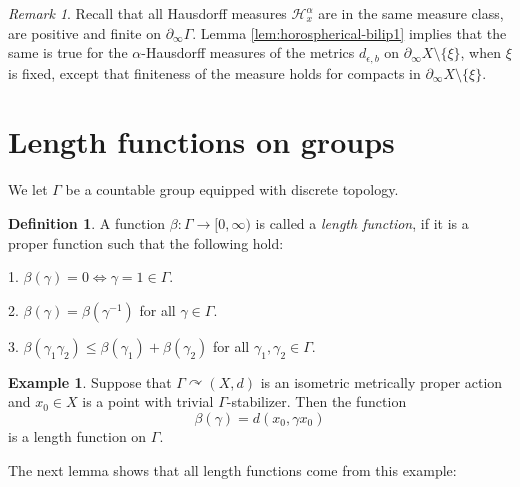\documentclass[12pt]{amsbook}%
\theoremstyle{definition}
\newtheorem{defi}[thm]{Definition}
\newtheorem{example}[thm]{Example}
\theoremstyle{remark}
\newtheorem{rem}[thm]{Remark}
\numberwithin{section}{chapter}
\numberwithin{subsection}{section}
\numberwithin{figure}{chapter}
\DeclareMathOperator{\acts}{\curvearrowright}
\def\eps{\epsilon}
\def\cH{{\mathscr{H}}}
\def\Ga{\Gamma}
\def\ga{\gamma}
\def\al{\alpha}
\def\geo{\partial_\infty}
\def\kap{}
\begin{document}

\begin{rem}
Recall that all Hausdorff measures $\cH^\al_x$ are in the same measure class, are positive and finite on $\geo \Ga$. Lemma \ref{lem:horospherical-bilip1} implies that  
the same is true for the $\al$-Hausdorff measures of the metrics $d_{\eps,b}$ on $\geo X\setminus \{\xi\}$, when $\xi$ is fixed, except that finiteness of the measure 
holds for compacts in $\geo X\setminus \{\xi\}$. 
\end{rem}


\section{Length functions on groups}\label{sec:length functions}



We let $\Gamma$ be a countable group equipped with discrete topology. 

\begin{defi} A function $\beta: \Gamma\to [0,\infty)$ is called  a {\em length function}, if it is  
a proper function such that the following hold:

1. $\beta(\ga)=0\iff \ga =1\in \Ga$.

2.  $\beta(\gamma)=\beta(\gamma^{-1})$ for all $\gamma\in\Gamma$. 
 
3. $\beta(\gamma_1 \gamma_2)\leqslant \beta(\gamma_1) + \beta(\gamma_2)$  for all $\gamma_1, \gamma_2\in\Gamma$. 
\end{defi}

\begin{example}
Suppose that $\Ga\acts (X,d)$ is an isometric metrically proper action and $x_0\in X$ is a point with trivial $\Ga$-stabilizer. Then the function
$$
\beta(\ga)=d(x_0, \ga x_0)
$$
is a length function on $\Ga$. 
\end{example}

The next lemma shows that all length functions come from this example:
\end{document}
